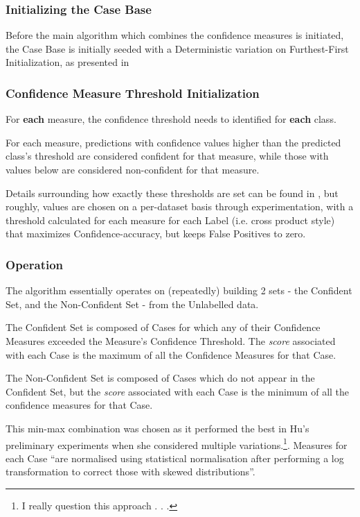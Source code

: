 \documentclass[a4paper,11pt]{report}
\begin{document}
\subsubsection{Initializing the Case Base}
Before the main algorithm which combines the confidence measures is initiated, the Case Base is initially seeded with a Deterministic variation on Furthest-First Initialization, as presented in \citet{Greene2007}

\subsubsection{Confidence Measure Threshold Initialization}
For \textbf{each} measure, the confidence threshold needs to identified for \textbf{each} class.

For each measure, predictions with confidence values higher than the predicted class's threshold are considered confident for that measure, while those with values below are considered non-confident for that measure.

Details surrounding how exactly these thresholds are set can be found in \citet{Delany2005}, but roughly, values are chosen on a per-dataset basis through experimentation, with a threshold calculated for each measure for each Label (i.e. cross product style) that maximizes Confidence-accuracy, but keeps False Positives to zero.

\subsubsection{Operation}
The algorithm essentially operates on (repeatedly) building 2 sets - the Confident Set, and the Non-Confident Set - from the Unlabelled data.

The Confident Set is composed of Cases for which any of their Confidence Measures exceeded the Measure's Confidence Threshold. The \emph{score} associated with each Case is the maximum of all the Confidence Measures for that Case.

The Non-Confident Set is composed of Cases which do not appear in the Confident Set, but the \emph{score} associated with each Case is the minimum of all the confidence measures for that Case. 

This min-max combination was chosen as it performed the best in Hu's preliminary experiments when she considered multiple variations.\footnote{I really question this approach . . .}. Measures for each Case ``are normalised using statistical normalisation after performing a log transformation to correct those with skewed distributions''\cite{Hu2011}.
\end{document}
